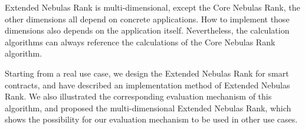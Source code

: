 Extended Nebulas Rank is multi-dimensional, except the Core Nebulas Rank, the other dimensions all depend on concrete applications. How to implement those dimensions also depends on the application itself. Nevertheless, the calculation algorithms can always reference the calculations of the Core Nebulas Rank algorithm.

\vspace{2em}

Starting from a real use case, we design the Extended Nebulas Rank for smart contracts, and have described an implementation method of Extended Nebulas Rank. We also illustrated the corresponding evaluation mechanism of this algorithm, and proposed the multi-dimensional Extended Nebulas Rank, which shows the possibility for our evaluation mechanism to be used in other use cases.
